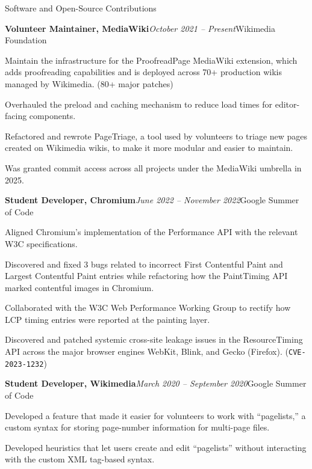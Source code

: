 \documentclass{resume} %
\begin{document}
\begin{rSection}{Software and Open-Source Contributions}
\begin{rSubsection}{\bf Volunteer Maintainer, MediaWiki}{\em October 2021 -- Present}{Wikimedia Foundation}{}
\item Maintain the infrastructure for the ProofreadPage MediaWiki extension, which adds proofreading capabilities and is deployed across 70+ production wikis managed by Wikimedia. (80+ major patches)
\item Overhauled the preload and caching mechanism to reduce load times for editor-facing components.
\item Refactored and rewrote PageTriage, a tool used by volunteers to triage new pages created on Wikimedia wikis, to make it more modular and easier to maintain.
\item Was granted commit access across all projects under the MediaWiki umbrella in 2025.
\end{rSubsection}
\begin{rSubsection}{\bf Student Developer, Chromium}{\em June 2022 -- November 2022}{Google Summer of Code}{}
\item Aligned Chromium's implementation of the Performance API with the relevant W3C specifications.
\item Discovered and fixed 3 bugs related to incorrect First Contentful Paint and Largest Contentful Paint entries while refactoring how the PaintTiming API marked contentful images in Chromium.
\item Collaborated with the W3C Web Performance Working Group to rectify how LCP timing entries were reported at the painting layer.
\item Discovered and patched systemic cross-site leakage issues in the ResourceTiming API across the major browser engines WebKit, Blink, and Gecko (Firefox). (\texttt{CVE-2023-1232})
\end{rSubsection}
\begin{rSubsection}{\bf Student Developer, Wikimedia}{\em March 2020 -- September 2020}{Google Summer of Code}{}
\item Developed a feature that made it easier for volunteers to work with ``pagelists,'' a custom syntax for storing page-number information for multi-page files.
\item Developed heuristics that let users create and edit ``pagelists'' without interacting with the custom XML tag-based syntax.

\end{rSubsection}
\end{rSection}
\end{document}
